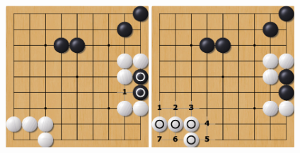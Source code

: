 \documentclass[compress, color = usenames, dvipsnames]{beamer}
\begin{document}
{\begin{center}
       { \includegraphics[width=0.4\textwidth]{figs/gorule_string5.png} }
       { \includegraphics[width=0.4\textwidth]{figs/gorule_string6.png} }
  \end{center}

}
\end{document}
